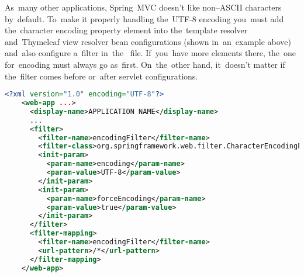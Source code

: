 As~many other applications, Spring~MVC doesn't like non--ASCII characters by~default.
To~make it properly handling the~UTF-8 encoding you~must add the~character encoding property element into the~template resolver and~Thymeleaf view resolver bean configurations (shown in~an~example above) and~also configure a~filter in~the~ file.
If~you~have more  elements there, the~one for~encoding must always go as~first.
On~the~other hand, it~doesn't matter if the~filter comes before or~after servlet configurations.

\begin{lstlisting}[language=XML, title=Example of a~\textit{web.xml} file with encoding filter configuration]
    <?xml version="1.0" encoding="UTF-8"?>
    <web-app ...>
      <display-name>APPLICATION NAME</display-name>
      ...
      <filter>
        <filter-name>encodingFilter</filter-name>
        <filter-class>org.springframework.web.filter.CharacterEncodingFilter </filter-class>
        <init-param>
          <param-name>encoding</param-name>
          <param-value>UTF-8</param-value>
        </init-param>
        <init-param>
          <param-name>forceEncoding</param-name>
          <param-value>true</param-value>
        </init-param>
      </filter>
      <filter-mapping>
        <filter-name>encodingFilter</filter-name>
        <url-pattern>/*</url-pattern>
      </filter-mapping>
    </web-app>
\end{lstlisting}
\newpage
